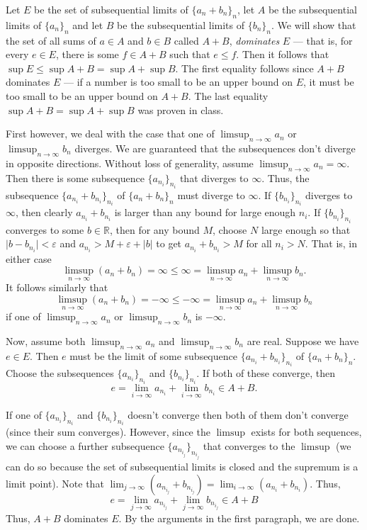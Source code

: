 \documentclass[12 pt, letterpaper]{hmcpset}
\begin{document}
\begin{solution}
	Let $E$ be the set of subsequential limits of $\{ a_{n} + b_{n} \}_{n}$, let $A$ be the subsequential limits of $\{ a_{n} \}_{n}$ and let $B$ be the subsequential limits of $\{ b_{n} \}_{n}$. We will show that the set of all sums of $a \in A$ and $b \in B$ called $A + B$, \emph{dominates} $E$ --- that is, for every $e \in E$, there is some $f \in A + B$ such that $e \le f$. Then it follows that $\sup E \le \sup A + B = \sup A + \sup B$. The first equality follows since $A + B$ dominates $E$ --- if a number is too small to be an upper bound on $E$, it must be too small to be an upper bound on $A + B$. The last equality $\sup A + B = \sup A + \sup B$ was proven in class.

	First however, we deal with the case that one of $\limsup_{n \to \infty} a_{n}$ or $\limsup_{n \to \infty} b_{n}$ diverges. We are guaranteed that the subsequences don't diverge in opposite directions. Without loss of generality, assume $\limsup_{n \to \infty} a_{n} = \infty$. Then there is some subsequence $\{ a_{n_{i}} \}_{n_{i}}$ that diverges to $\infty$. Thus, the subsequence $\{ a_{n_{i}} + b_{n_{i}} \}_{n_{i}}$ of $\{ a_{n} + b_{n} \}_{n}$ must diverge to $\infty$. If $\{ b_{n_{i}} \}_{n_{i}}$ diverges to $\infty$, then clearly $a_{n_{i}} + b_{n_{i}}$ is larger than any bound for large enough $n_{i}$. If $\{ b_{n_{i}} \}_{n_{i}}$ converges to some $b \in \mathbb{R}$, then for any bound $M$, choose $N$ large enough so that $\lvert b - b_{n_{i}} \rvert < \varepsilon$ and $a_{n_{i}} > M + \varepsilon + \lvert b \rvert$ to get $a_{n_{i}} + b_{n_{i}} > M$ for all $n_{i} > N$. That is, in either case
	\[
		\limsup_{n \to \infty} (a_{n} + b_{n}) = \infty \le \infty = \limsup_{n \to \infty} a_{n} + \limsup_{n \to \infty} b_{n}.
	\]
	It follows similarly that
	\[
		\limsup_{n \to \infty} (a_{n} + b_{n}) = -\infty \le -\infty = \limsup_{n \to \infty} a_{n} + \limsup_{n \to \infty} b_{n}
	\]
	if one of $\limsup_{n \to \infty} a_{n}$ or $\limsup_{n \to \infty} b_{n}$ is $-\infty$.

	Now, assume both $\limsup_{n \to \infty} a_{n}$ and $\limsup_{n \to \infty} b_{n}$ are real. Suppose we have $e \in E$. Then $e$ must be the limit of some subsequence $\{ a_{n_{i}} + b_{n_{i}} \}_{n_{i}}$ of $\{ a_{n} + b_{n} \}_{n}$. Choose the subsequences $\{ a_{n_{i}} \}_{n_{i}}$ and $\{ b_{n_{i}} \}_{n_{i}}$. If both of these converge, then
	\[
		e = \lim_{i \to \infty} a_{n_{i}} + \lim_{i \to \infty} b_{n_{i}} \in A + B.
	\]

	If one of $\{ a_{n_{i}} \}_{n_{i}}$ and $\{ b_{n_{i}} \}_{n_{i}}$ doesn't converge then both of them don't converge (since their sum converges). However, since the $\limsup$ exists for both sequences, we can choose a further subsequence $\{ a_{n_{i_{j}}} \}_{n_{i_{j}}}$ that converges to the $\limsup$ (we can do so because the set of subsequential limits is closed and the supremum is a limit point). Note that $\lim_{j \to \infty} (a_{n_{i_{j}}} + b_{n_{i_{j}}}) = \lim_{i \to \infty} (a_{n_{i}} + b_{n_{i}})$. Thus,
	\[
		e = \lim_{j \to \infty} a_{n_{i_{j}}} + \lim_{j \to \infty} b_{n_{i_{j}}} \in A + B	
	\]
	Thus, $A + B$ dominates $E$. By the arguments in the first paragraph, we are done.
\end{solution}
\end{document}
